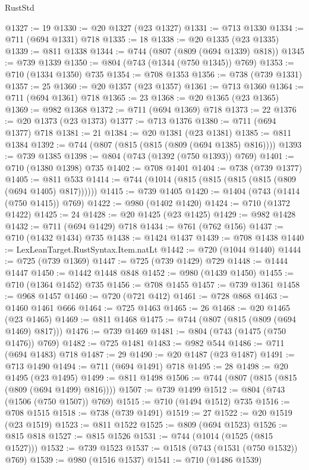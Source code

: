 \begin{lexlean}{RustStd}
\begin{coremodule}
@1327 := 19
@1330 := @20 @1327 (@23 @1327)
@1331 := @713 @1330
@1334 := @711 (@694 @1331) @718
@1335 := 18
@1338 := @20 @1335 (@23 @1335)
@1339 := @811 @1338
@1344 := @744 (@807 (@809 (@694 @1339) @818))
@1345 := @739 @1339
@1350 := @804 (@743 (@1344 (@750 @1345)) @769)
@1353 := @710 (@1334 @1350) @735
@1354 := @708 @1353
@1356 := @738 (@739 @1331)
@1357 := 25
@1360 := @20 @1357 (@23 @1357)
@1361 := @713 @1360
@1364 := @711 (@694 @1361) @718
@1365 := 23
@1368 := @20 @1365 (@23 @1365)
@1369 := @982 @1368
@1372 := @711 (@694 @1369) @718
@1373 := 22
@1376 := @20 @1373 (@23 @1373)
@1377 := @713 @1376
@1380 := @711 (@694 @1377) @718
@1381 := 21
@1384 := @20 @1381 (@23 @1381)
@1385 := @811 @1384
@1392 := @744 (@807 (@815 (@815 (@809 (@694 @1385) @816))))
@1393 := @739 @1385
@1398 := @804 (@743 (@1392 (@750 @1393)) @769)
@1401 := @710 (@1380 @1398) @735
@1402 := @708 @1401
@1404 := @738 (@739 @1377)
@1405 := @811 @533
@1414 := @744 (@1014 (@815 (@815 (@815 (@815 (@809 (@694 @1405) @817))))))
@1415 := @739 @1405
@1420 := @1404 (@743 (@1414 (@750 @1415)) @769)
@1422 := @980 (@1402 @1420)
@1424 := @710 (@1372 @1422)
@1425 := 24
@1428 := @20 @1425 (@23 @1425)
@1429 := @982 @1428
@1432 := @711 (@694 @1429) @718
@1434 := @761 (@762 @156)
@1437 := @710 (@1432 @1434) @735
@1438 := @1424 @1437
@1439 := @708 @1438
@1440 := LexLeanTarget.RustSyntax.Item.natLt
@1442 := @720 (@1044 @1440)
@1444 := @725 (@739 @1369)
@1447 := @725 (@739 @1429) @729
@1448 := @1444 @1447
@1450 := @1442 @1448 @848
@1452 := @980 (@1439 @1450)
@1455 := @710 (@1364 @1452) @735
@1456 := @708 @1455
@1457 := @739 @1361
@1458 := @968 @1457
@1460 := @720 (@721 @412)
@1461 := @728 @868
@1463 := @1460 @1461 @666
@1464 := @725 @1463
@1465 := 26
@1468 := @20 @1465 (@23 @1465)
@1469 := @811 @1468
@1475 := @744 (@807 (@815 (@809 (@694 @1469) @817)))
@1476 := @739 @1469
@1481 := @804 (@743 (@1475 (@750 @1476)) @769)
@1482 := @725 @1481
@1483 := @982 @544
@1486 := @711 (@694 @1483) @718
@1487 := 29
@1490 := @20 @1487 (@23 @1487)
@1491 := @713 @1490
@1494 := @711 (@694 @1491) @718
@1495 := 28
@1498 := @20 @1495 (@23 @1495)
@1499 := @811 @1498
@1506 := @744 (@807 (@815 (@815 (@809 (@694 @1499) @816))))
@1507 := @739 @1499
@1512 := @804 (@743 (@1506 (@750 @1507)) @769)
@1515 := @710 (@1494 @1512) @735
@1516 := @708 @1515
@1518 := @738 (@739 @1491)
@1519 := 27
@1522 := @20 @1519 (@23 @1519)
@1523 := @811 @1522
@1525 := @809 (@694 @1523)
@1526 := @815 @818
@1527 := @815 @1526
@1531 := @744 (@1014 (@1525 (@815 @1527)))
@1532 := @739 @1523
@1537 := @1518 (@743 (@1531 (@750 @1532)) @769)
@1539 := @980 (@1516 @1537)
@1541 := @710 (@1486 @1539)

\end{coremodule}
\end{lexlean}
